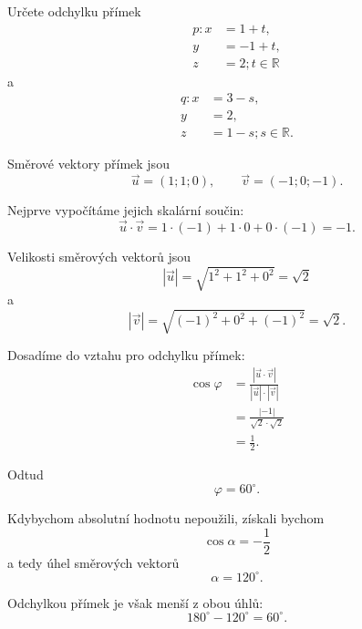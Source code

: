 \begin{example}
    \label{exa:Angle_between_intersecting_lines_space}

    Určete odchylku přímek
    \[
        \begin{aligned}
            p: x&=1+t,\\
            y&=-1+t,\\
            z&=2; t\in\mathbb{R}
        \end{aligned}
    \]
    a
    \[
        \begin{aligned}
            q: x&=3-s,\\
            y&=2,\\
            z&=1-s; s\in\mathbb{R}.
        \end{aligned}
    \]

    Směrové vektory přímek jsou
    \[
        \vec{u}=(1;1;0),
        \qquad
        \vec{v}=(-1;0;-1).
    \]

    Nejprve vypočítáme jejich skalární součin:
    \[
        \vec{u}\cdot\vec{v}
        =
        1\cdot(-1)+1\cdot0+0\cdot(-1)
        =
        -1.
    \]

    Velikosti směrových vektorů jsou
    \[
        |\vec{u}|
        =
        \sqrt{1^2+1^2+0^2}
        =
        \sqrt{2}
    \]
    a
    \[
        |\vec{v}|
        =
        \sqrt{(-1)^2+0^2+(-1)^2}
        =
        \sqrt{2}.
    \]

    Dosadíme do vztahu pro odchylku přímek:
    \begin{align*}
        \cos\varphi
        &=
        \frac{|\vec{u}\cdot\vec{v}|}
             {|\vec{u}|\cdot|\vec{v}|}\\
        &=
        \frac{|-1|}
             {\sqrt{2}\cdot\sqrt{2}}\\
        &=
        \frac12.
    \end{align*}

    Odtud
    \[
        \varphi=60^\circ.
    \]

    Kdybychom absolutní hodnotu nepoužili, získali bychom
    \[
        \cos\alpha=-\frac12
    \]
    a tedy úhel směrových vektorů
    \[
        \alpha=120^\circ.
    \]

    Odchylkou přímek je však menší z obou úhlů:
    \[
        180^\circ-120^\circ=60^\circ.
    \]
\end{example}

